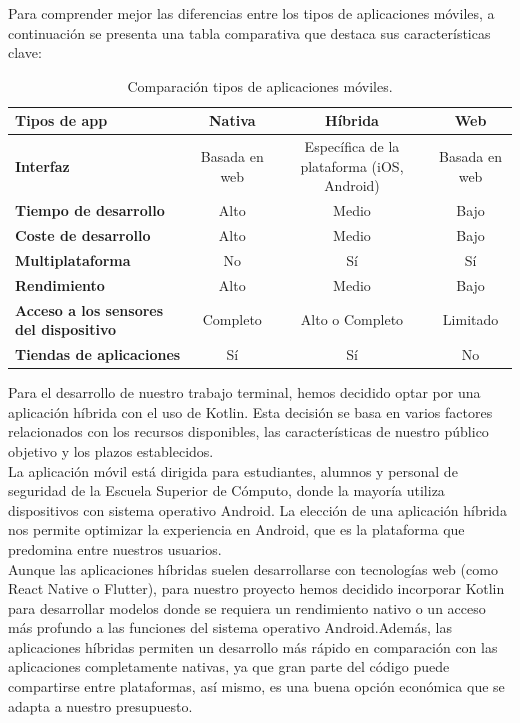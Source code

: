 Para comprender mejor las diferencias entre los tipos de aplicaciones móviles, a continuación se presenta una tabla comparativa que destaca sus características clave:
\newpage

\begin{table}[h!]
	\centering
	\begin{tabular}{|l|c|c|c|}
		\hline
		\textbf{Tipos de app} & \textbf{Nativa} & \textbf{Híbrida} & \textbf{Web} \\ \hline
		\textbf{Interfaz} & Basada en web & Específica de la plataforma (iOS, Android) & Basada en web \\ \hline
		\textbf{Tiempo de desarrollo} & Alto & Medio & Bajo \\ \hline
		\textbf{Coste de desarrollo} & Alto & Medio & Bajo \\ \hline
		\textbf{Multiplataforma} & No & Sí & Sí \\ \hline
		\textbf{Rendimiento} & Alto & Medio & Bajo \\ \hline
		\textbf{Acceso a los sensores del dispositivo} & Completo & Alto o Completo & Limitado \\ \hline
		\textbf{Tiendas de aplicaciones} & Sí & Sí & No \\ \hline
	\end{tabular}
	\caption{Comparación tipos de aplicaciones móviles.}
	\label{tab:tipos_apps}
\end{table}

Para el desarrollo de nuestro trabajo terminal, hemos decidido optar por una aplicación híbrida con el uso de Kotlin. Esta decisión se basa en varios factores relacionados con los recursos disponibles, las características de nuestro público objetivo y los plazos establecidos. \\

La aplicación móvil está dirigida para estudiantes, alumnos y personal de seguridad de la Escuela Superior de Cómputo, donde la mayoría utiliza dispositivos con sistema operativo Android. La elección de una aplicación híbrida nos permite optimizar  la experiencia en Android, que es la plataforma que predomina entre nuestros usuarios. \\

Aunque las aplicaciones híbridas suelen desarrollarse con tecnologías web (como React Native o Flutter), para nuestro proyecto hemos decidido incorporar Kotlin para desarrollar modelos donde se requiera un rendimiento nativo o un acceso más profundo a las funciones del sistema operativo Android.Además, las aplicaciones híbridas permiten un desarrollo más rápido en comparación con las aplicaciones completamente nativas, ya que gran parte del código puede compartirse entre plataformas, así mismo, es una buena opción económica que se adapta a nuestro presupuesto. 

